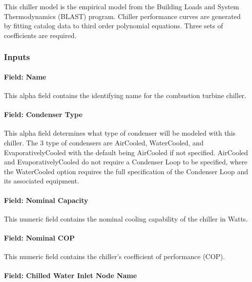 This chiller model is the empirical model from the Building Loads and System Thermodynamics (BLAST) program. Chiller performance curves are generated by fitting catalog data to third order polynomial equations. Three sets of coefficients are required.

\subsubsection{Inputs}\label{inputs-7-018}

\paragraph{Field: Name}\label{field-name-6-015}

This alpha field contains the identifying name for the combustion turbine chiller.

\paragraph{Field: Condenser Type}\label{field-condenser-type-4-000}

This alpha field determines what type of condenser will be modeled with this chiller. The 3 type of condensers are AirCooled, WaterCooled, and EvaporativelyCooled with the default being AirCooled if not specified. AirCooled and EvaporativelyCooled do not require a Condenser Loop to be specified, where the WaterCooled option requires the full specification of the Condenser Loop and its associated equipment.

\paragraph{Field: Nominal Capacity}\label{field-nominal-capacity-5}

This numeric field contains the nominal cooling capability of the chiller in Watts.

\paragraph{Field: Nominal COP}\label{field-nominal-cop-3}

This numeric field contains the chiller's coefficient of performance (COP).

\paragraph{Field: Chilled Water Inlet Node Name}\label{field-chilled-water-inlet-node-name-6}

